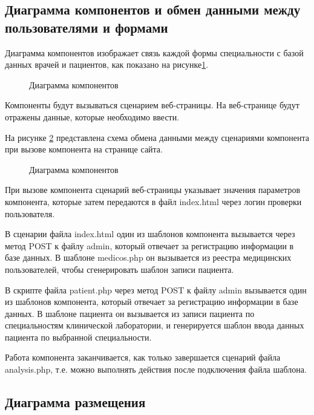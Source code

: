 \subsection{Диаграмма компонентов и обмен данными между пользователями и формами}

Диаграмма компонентов изображает связь каждой формы специальности с базой данных врачей и пациентов, как показано на рисунке\ref{fig:diag}.

\begin{figure}[H]
\caption{Диаграмма компонентов}
\label{fig:diag}
\end{figure}

Компоненты будут вызываться сценарием веб-страницы. На веб-странице будут отражены данные, которые необходимо ввести.

На рисунке \ref{fig:comp} представлена схема обмена данными между сценариями компонента при вызове компонента на странице сайта.

\begin{figure}[H]
\caption{Диаграмма компонентов}
\label{fig:comp}
\end{figure}

При вызове компонента сценарий веб-страницы указывает значения параметров компонента, которые затем передаются в файл index.html через логин проверки пользователя.

В сценарии файла index.html один из шаблонов компонента вызывается через метод POST к файлу admin, который отвечает за регистрацию информации в базе данных. В шаблоне medicos.php он вызывается из реестра медицинских пользователей, чтобы сгенерировать шаблон записи пациента.

В скрипте файла patient.php через метод POST к файлу admin вызывается один из шаблонов компонента, который отвечает за регистрацию информации в базе данных. В шаблоне пациента он вызывается из записи пациента по специальностям клинической лаборатории, и генерируется шаблон ввода данных пациента по выбранной специальности.

Работа компонента заканчивается, как только завершается сценарий файла analysis.php, т.е. можно выполнять действия после подключения файла шаблона.

\subsection{Диаграмма размещения}

